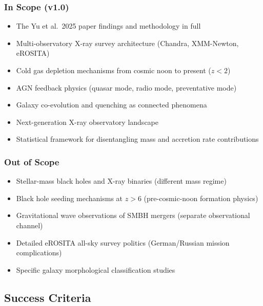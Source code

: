 \documentclass[11pt,letterpaper]{article}
\begin{document}
\subsubsection{In Scope (v1.0)}
\begin{itemize}
  \item The Yu et al.\ 2025 paper findings and methodology in full
  \item Multi-observatory X-ray survey architecture (Chandra, XMM-Newton, eROSITA)
  \item Cold gas depletion mechanisms from cosmic noon to present ($z < 2$)
  \item AGN feedback physics (quasar mode, radio mode, preventative mode)
  \item Galaxy co-evolution and quenching as connected phenomena
  \item Next-generation X-ray observatory landscape
  \item Statistical framework for disentangling mass and accretion rate contributions
\end{itemize}

\subsubsection{Out of Scope}
\begin{itemize}
  \item Stellar-mass black holes and X-ray binaries (different mass regime)
  \item Black hole seeding mechanisms at $z > 6$ (pre-cosmic-noon formation physics)
  \item Gravitational wave observations of SMBH mergers (separate observational channel)
  \item Detailed eROSITA all-sky survey politics (German/Russian mission complications)
  \item Specific galaxy morphological classification studies
\end{itemize}

\subsection{Success Criteria}
\end{document}

